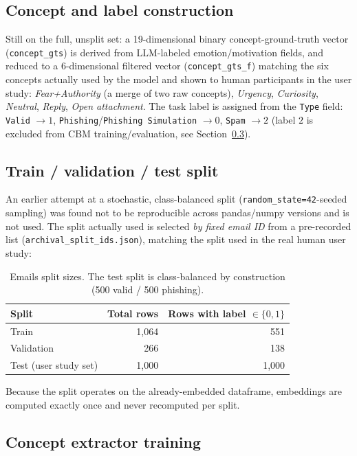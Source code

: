 \documentclass[11pt]{article}
\newcommand{\code}[1]{\texttt{#1}}
\begin{document}
\subsection{Concept and label construction}

Still on the full, unsplit set: a 19-dimensional binary concept-ground-truth
vector (\code{concept\_gts}) is derived from LLM-labeled emotion/motivation
fields, and reduced to a 6-dimensional filtered vector
(\code{concept\_gts\_f}) matching the six concepts actually used by the
model and shown to human participants in the user study:
\emph{Fear+Authority} (a merge of two raw concepts), \emph{Urgency},
\emph{Curiosity}, \emph{Neutral}, \emph{Reply}, \emph{Open attachment}. The
task label is assigned from the \code{Type} field: \code{Valid}
$\rightarrow 1$, \code{Phishing}/\code{Phishing Simulation} $\rightarrow 0$,
\code{Spam} $\rightarrow 2$ (label $2$ is excluded from CBM training/evaluation,
see Section~\ref{sec:emails-training}).

\subsection{Train / validation / test split}

An earlier attempt at a stochastic, class-balanced split
(\code{random\_state=42}-seeded sampling) was found not to be reproducible
across pandas/numpy versions and is not used. The split actually used is
selected \emph{by fixed email ID} from a pre-recorded list
(\code{archival\_split\_ids.json}), matching the split used in the real
human user study:

\begin{table}[h]
\centering
\begin{tabular}{lrr}
\toprule
Split & Total rows & Rows with label $\in\{0,1\}$ \\
\midrule
Train & 1{,}064 & 551 \\
Validation & 266 & 138 \\
Test (user study set) & 1{,}000 & 1{,}000 \\
\bottomrule
\end{tabular}
\caption{Emails split sizes. The test split is class-balanced by
construction (500 valid / 500 phishing).}
\end{table}

Because the split operates on the already-embedded dataframe, embeddings
are computed exactly once and never recomputed per split.

\subsection{Concept extractor training}
\label{sec:emails-training}
\end{document}
